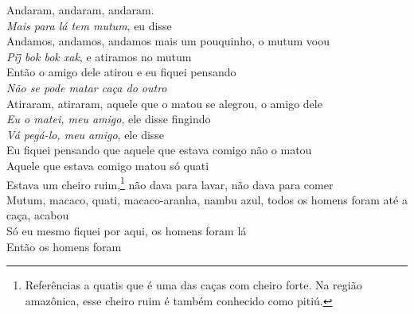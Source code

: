 \begin{linenumbers}\begingroup\raggedright
 
\noindent   Andaram, andaram, andaram.\\
  \emph{Mais para lá tem mutum}, eu disse\\
  Andamos, andamos, andamos mais um pouquinho, o mutum voou\\
  \emph{Pij̃ bok bok xak}, e atiramos no mutum\\
  Então o amigo dele atirou e eu fiquei pensando\\
  \emph{Não se pode matar caça do outro}\\
  Atiraram, atiraram, aquele que o matou se alegrou, o amigo dele\\
  \emph{Eu o matei, meu amigo}, ele disse fingindo\\
  \emph{Vá pegá-lo, meu amigo}, ele disse\\
  Eu fiquei pensando que aquele que estava comigo não o matou\\
  Aquele que estava comigo matou só quati\\
  Estava um cheiro ruim,\footnote{Referências a quatis que é uma das caças com cheiro forte. Na região amazônica, esse cheiro ruim é também conhecido como pitiú.} não dava para lavar, não dava para comer\\
  Mutum, macaco, quati, macaco-aranha, nambu azul, todos os homens
 foram até a caça, acabou\\
  Só eu mesmo fiquei por aqui, os homens foram lá\\
  Então os homens foram
 
\end{linenumbers}\endgroup

